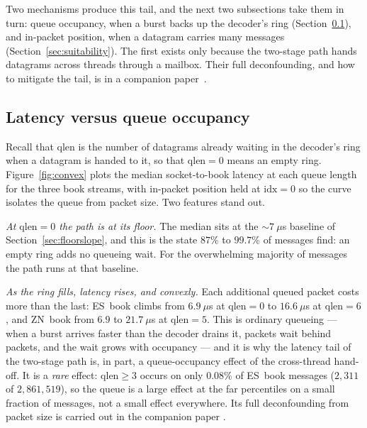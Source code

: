 \documentclass[11pt]{article}
\begin{document}
Two mechanisms produce this tail, and the next two subsections take them in turn:
queue occupancy, when a burst backs up the decoder's ring
(Section~\ref{sec:queue}), and in-packet position, when a datagram carries many
messages (Section~\ref{sec:suitability}). The first exists only because the
two-stage path hands datagrams across threads through a mailbox. Their
full deconfounding, and how to mitigate the tail, is in a companion
paper~\cite{mdarrival}.

\subsection{Latency versus queue occupancy}
\label{sec:queue}

Recall that $\text{qlen}$ is the number of datagrams already waiting in the
decoder's ring when a datagram is handed to it, so that $\text{qlen}=0$ means an
empty ring. Figure~\ref{fig:convex} plots the median
socket-to-book latency at each queue length for the three book streams, with
in-packet position held at $\text{idx}=0$ so the curve isolates the queue from
packet size. Two features stand out.

\emph{At $\text{qlen}=0$ the path is at its floor.} The median sits at the
$\sim\!7~\mu$s baseline of Section~\ref{sec:floorslope}, and this is the state
$87\%$ to $99.7\%$ of messages find: an empty ring adds no queueing wait. For the
overwhelming majority of messages the path runs at that baseline.

\emph{As the ring fills, latency rises, and convexly.} Each additional queued
packet costs more than the last: ES~book climbs from $6.9~\mu$s at $\text{qlen}=0$
to $16.6~\mu$s at $\text{qlen}=6$, and ZN~book from $6.9$ to $21.7~\mu$s at
$\text{qlen}=5$. This is ordinary queueing --- when a burst arrives faster than the
decoder drains it, packets wait behind packets, and the wait grows with occupancy
--- and it is why the latency tail of the two-stage path is, in part, a
queue-occupancy effect of the cross-thread hand-off. It is a \emph{rare} effect: $\text{qlen}\ge3$ occurs on only $0.08\%$ of ES~book messages
($2{,}311$ of $2{,}861{,}519$), so the queue is a large effect at the far
percentiles on a small fraction of messages, not a small effect everywhere. Its
full deconfounding from packet size is carried out in the companion paper
\cite{mdarrival}.
\end{document}
